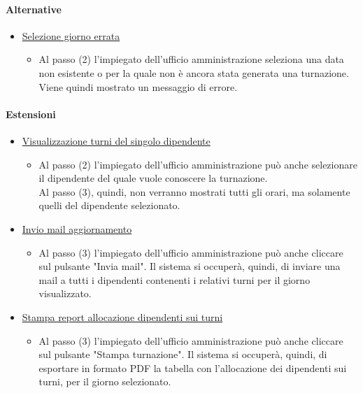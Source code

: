 \paragraph{Alternative}
\begin{itemize}
	\item \underline{Selezione giorno errata}
		\begin{itemize}
			\item Al passo (2) l'impiegato dell'ufficio amministrazione seleziona una data non esistente o per la quale non è ancora stata generata una turnazione. Viene quindi mostrato un messaggio di errore.
		\end{itemize}
\end{itemize}
\paragraph{Estensioni}
\begin{itemize}
	\item \underline{Visualizzazione turni del singolo dipendente}
		\begin{itemize}
			\item Al passo (2) l'impiegato dell'ufficio amministrazione può anche selezionare il dipendente del quale vuole conoscere la turnazione.\\
				Al passo (3), quindi, non verranno mostrati tutti gli orari, ma solamente quelli del dipendente selezionato.
		\end{itemize}
	\item \underline{Invio mail aggiornamento}
		\begin{itemize}
			\item Al passo (3) l'impiegato dell'ufficio amministrazione può anche cliccare sul pulsante "Invia mail". Il sistema si occuperà, quindi, di inviare una mail a tutti i dipendenti contenenti i relativi turni per il giorno visualizzato.
		\end{itemize}
	\item \underline{Stampa report allocazione dipendenti sui turni}
		\begin{itemize}
			\item Al passo (3) l'impiegato dell'ufficio amministrazione può anche cliccare sul pulsante "Stampa turnazione". Il sistema si occuperà, quindi, di esportare in formato PDF la tabella con l'allocazione dei dipendenti sui turni, per il giorno selezionato.
		\end{itemize}
\end{itemize}